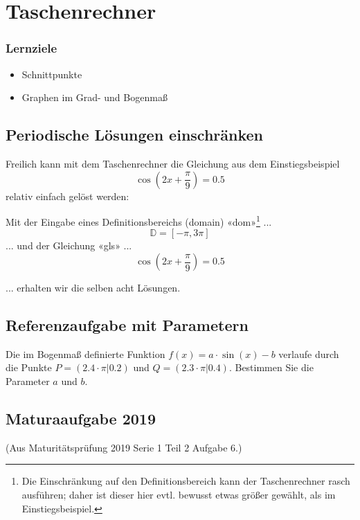 
\section{Taschenrechner}

\subsubsection*{Lernziele}

\begin{itemize}
\item Schnittpunkte
\item Graphen im Grad- und Bogenmaß
\end{itemize}

\subsection{Periodische Lösungen einschränken}
Freilich kann mit dem Taschenrechner die Gleichung aus dem
Einstiegsbeispiel $$\cos\left(2x+\frac{\pi}{9}\right)=0.5$$ relativ einfach gelöst werden:

Mit der Eingabe eines Definitionsbereichs (domain) «dom»\footnote{Die Einschränkung auf den Definitionsbereich kann der Taschenrechner rasch ausführen; daher ist dieser hier evtl. bewusst etwas größer gewählt, als im Einstiegsbeispiel.}  ...
$$\mathbb{D} =  [ -\pi , 3\pi]$$
... und der Gleichung «gls» ...
$$\cos\left(2x+\frac{\pi}{9}\right) = 0.5$$

... erhalten wir die selben acht Lösungen.
    

\newpage

\subsection{Referenzaufgabe mit Parametern}
Die im Bogenmaß definierte Funktion $f(x) = a\cdot{}\sin(x)-b$
verlaufe durch die Punkte $P=(2.4\cdot{}\pi | 0.2)$ und
$Q=(2.3\cdot{}\pi|0.4)$. Bestimmen Sie die Parameter $a$ und $b$.


\subsection{Maturaaufgabe 2019}
(Aus Maturitätsprüfung 2019 Serie 1 Teil 2 Aufgabe 6.)

